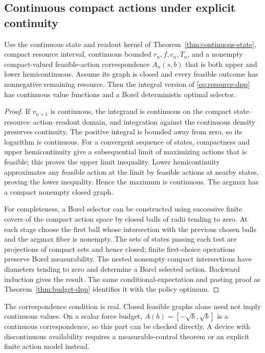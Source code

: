\subsection{Continuous compact actions under explicit continuity}
\begin{proposition}\label{prop:continuous-dpp}
Use the continuous state and readout kernel of Theorem~\ref{thm:continuous-state}, compact resource interval, continuous bounded $r_n,f,c_n,T_n$, and a nonempty compact-valued feasible-action correspondence $A_n(s,b)$ that is both upper and lower hemicontinuous. Assume its graph is closed and every feasible outcome has nonnegative remaining resource. Then the integral version of \eqref{eq:resource-dpp} has continuous value functions and a Borel deterministic optimal selector.
\end{proposition}
\begin{proof}
If $v_{n+1}$ is continuous, the integrand is continuous on the compact state--resource--action--readout domain, and integration against the continuous density preserves continuity. The positive integral is bounded away from zero, so its logarithm is continuous. For a convergent sequence of states, compactness and upper hemicontinuity give a subsequential limit of maximizing actions that is feasible; this proves the upper limit inequality. Lower hemicontinuity approximates any feasible action at the limit by feasible actions at nearby states, proving the lower inequality. Hence the maximum is continuous. The argmax has a compact nonempty closed graph.

For completeness, a Borel selector can be constructed using successive finite covers of the compact action space by closed balls of radii tending to zero. At each stage choose the first ball whose intersection with the previous chosen balls and the argmax fiber is nonempty. The sets of states passing each test are projections of compact sets and hence closed; finite first-choice operations preserve Borel measurability. The nested nonempty compact intersections have diameters tending to zero and determine a Borel selected action. Backward induction gives the result. The same conditional-expectation and pasting proof as Theorem~\ref{thm:budget-dpp} identifies it with the policy optimum.
\end{proof}

The correspondence condition is real. Closed feasible graphs alone need not imply continuous values. On a scalar force budget, $A(b)=[-\sqrt b,\sqrt b]$ is a continuous correspondence, so this part can be checked directly. A device with discontinuous availability requires a measurable-control theorem or an explicit finite action model instead.

